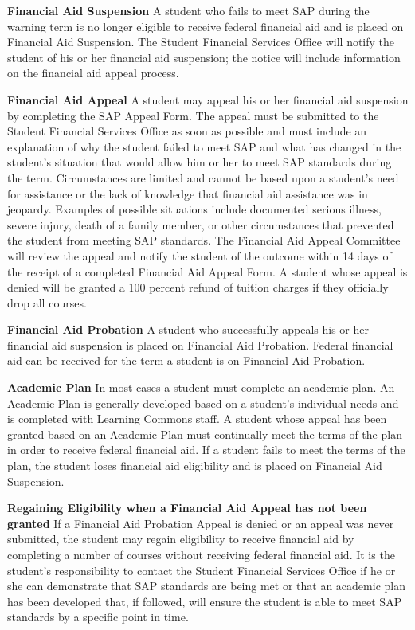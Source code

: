 \documentclass[
  letterpaper,
]{scrbook}
\begin{document}
\textbf{Financial Aid Suspension} A student who fails to meet SAP during
the warning term is no longer eligible to receive federal financial aid
and is placed on Financial Aid Suspension. The Student Financial
Services Office will notify the student of his or her financial aid
suspension; the notice will include information on the financial aid
appeal process.

\textbf{Financial Aid Appeal} A student may appeal his or her financial
aid suspension by completing the SAP Appeal Form. The appeal must be
submitted to the Student Financial Services Office as soon as possible
and must include an explanation of why the student failed to meet SAP
and what has changed in the student's situation that would allow him or
her to meet SAP standards during the term. Circumstances are limited and
cannot be based upon a student's need for assistance or the lack of
knowledge that financial aid assistance was in jeopardy. Examples of
possible situations include documented serious illness, severe injury,
death of a family member, or other circumstances that prevented the
student from meeting SAP standards. The Financial Aid Appeal Committee
will review the appeal and notify the student of the outcome within 14
days of the receipt of a completed Financial Aid Appeal Form. A student
whose appeal is denied will be granted a 100 percent refund of tuition
charges if they officially drop all courses.

\textbf{Financial Aid Probation} A student who successfully appeals his
or her financial aid suspension is placed on Financial Aid Probation.
Federal financial aid can be received for the term a student is on
Financial Aid Probation.

\textbf{Academic Plan} In most cases a student must complete an academic
plan. An Academic Plan is generally developed based on a student's
individual needs and is completed with Learning Commons staff. A student
whose appeal has been granted based on an Academic Plan must continually
meet the terms of the plan in order to receive federal financial aid. If
a student fails to meet the terms of the plan, the student loses
financial aid eligibility and is placed on Financial Aid Suspension.

\textbf{Regaining Eligibility when a Financial Aid Appeal has not been
granted} If a Financial Aid Probation Appeal is denied or an appeal was
never submitted, the student may regain eligibility to receive financial
aid by completing a number of courses without receiving federal
financial aid. It is the student's responsibility to contact the Student
Financial Services Office if he or she can demonstrate that SAP
standards are being met or that an academic plan has been developed
that, if followed, will ensure the student is able to meet SAP standards
by a specific point in time.
\end{document}
